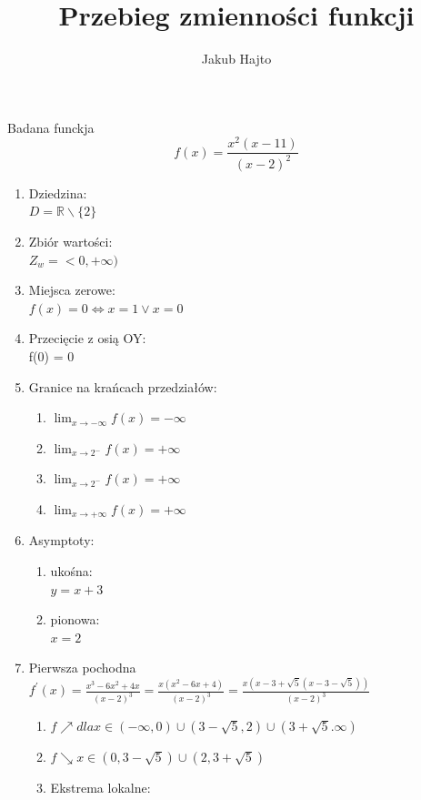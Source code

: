 \documentclass[11pt]{scrartcl}
\title{Przebieg zmienności funkcji}
\author{Jakub Hajto}
\begin{document}
	\maketitle
	\begin{center}
	Badana funckja $$ f(x) = \frac{x^2(x-11)}{(x-2)^2} $$
	\end{center}
	\begin{enumerate}  
		\item Dziedzina: \\
			$ D = \mathbb{R} \backslash \{2\} $
		\item Zbiór wartości: \\
			$ Z_w = <0, +\infty) $
		\item Miejsca zerowe: \\
			$ f(x) = 0 \Longleftrightarrow x = 1 \vee x = 0 $
		\item Przecięcie z osią OY: \\
			f(0) = 0
		\item Granice na krańcach przedziałów:
			\begin{enumerate}
				\item $ \lim_{x\to-\infty} f(x) = -\infty $
				\item $ \lim_{x\to2^-} f(x) = +\infty $
				\item $ \lim_{x\to2^-} f(x) = +\infty $
				\item $ \lim_{x\to+\infty} f(x) = +\infty $
			\end{enumerate}
		\item Asymptoty:
			\begin{enumerate}
				\item ukośna: \\
					$ y = x + 3$
				\item pionowa: \\
					$ x=2 $
			\end{enumerate}
		\item Pierwsza pochodna \\
			$ f^{\prime}(x) = \frac{x^3 -6x^2 +4x}{(x-2)^3} =  \frac{x(x^2 -6x +4)}{(x-2)^3}=  \frac{x(x - 3 + \sqrt{5}(x - 3 - \sqrt{5}))}{(x-2)^3} $
			\begin{enumerate}
				\item $ f\nearrow dla x \in (-\infty, 0) \cup (3-\sqrt{5}, 2) \cup ( 3+\sqrt{5}. \infty) $
				\item $ f\searrow x \in ( 0, 3-\sqrt{5}) \cup (2 , 3+\sqrt{5}) $
				\item Ekstrema lokalne:
				\begin{enumerate}

\end{enumerate}
\end{enumerate}
\end{enumerate}
\end{document}
